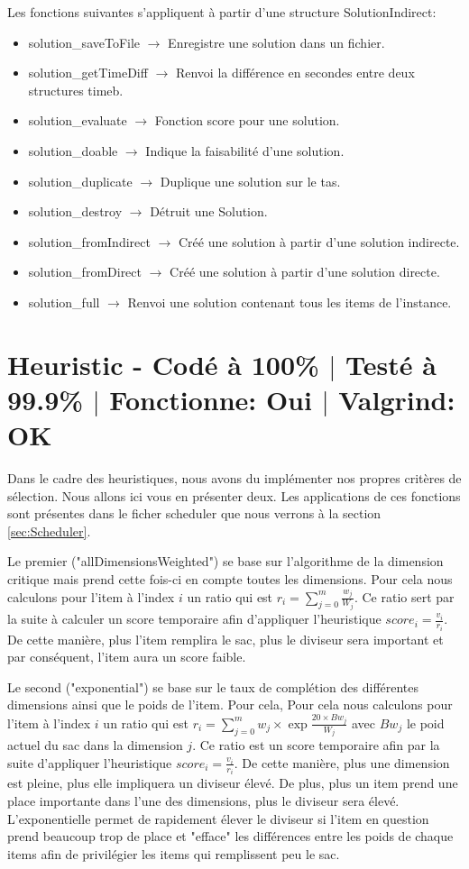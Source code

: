 \documentclass{EPUProjetPeiP}
\newcommand{\comp}[5]{
	\section[#1]{#1 {\small - Codé à #2\% $\vert$ Testé à #3\% $\vert$ Fonctionne: #4 $\vert$ Valgrind: #5}}
}
\begin{document}
Les fonctions suivantes s'appliquent à partir d'une structure SolutionIndirect:
\begin{itemize}
	\item solution\_saveToFile $\longrightarrow$ Enregistre une solution dans un fichier.
	\item solution\_getTimeDiff $\longrightarrow$ Renvoi la différence en secondes entre deux structures timeb.
	\item solution\_evaluate $\longrightarrow$ Fonction score pour une solution.
	\item solution\_doable $\longrightarrow$ Indique la faisabilité d'une solution.
	\item solution\_duplicate $\longrightarrow$ Duplique une solution sur le tas.
	\item solution\_destroy $\longrightarrow$ Détruit une Solution.
	\item solution\_fromIndirect $\longrightarrow$ Créé une solution à partir d'une solution indirecte.
	\item solution\_fromDirect $\longrightarrow$ Créé une solution à partir d'une solution directe.
	\item solution\_full $\longrightarrow$ Renvoi une solution contenant tous les items de l'instance.
\end{itemize}

\comp{Heuristic \label{sec:Heuristic}}{100}{99.9}{Oui}{OK}
Dans le cadre des heuristiques, nous avons du implémenter nos propres critères de sélection. Nous allons ici vous en présenter deux. Les applications de ces fonctions sont présentes dans le ficher scheduler que nous verrons à la section \ref{sec:Scheduler}.

Le premier ("allDimensionsWeighted") se base sur l'algorithme de la dimension critique mais prend cette fois-ci en compte toutes les dimensions. Pour cela nous calculons pour l'item à l'index $i$ un ratio qui est $r_i=\sum_{j=0}^m\frac{w_j}{W_j}$. Ce ratio sert par la suite à calculer un score temporaire afin d'appliquer l'heuristique $score_i=\frac{v_i}{r_i}$. De cette manière, plus l'item remplira le sac, plus le diviseur sera important et par conséquent, l'item aura un score faible.

Le second ("exponential") se base sur le taux de complétion des différentes dimensions ainsi que le poids de l'item. Pour cela, Pour cela nous calculons pour l'item à l'index $i$ un ratio qui est $r_i=\sum_{j=0}^mw_j\times\exp{\frac{20\times Bw_j}{W_j}}$ avec $Bw_j$ le poid actuel du sac dans la dimension $j$. Ce ratio est un score temporaire afin par la suite d'appliquer l'heuristique $score_i=\frac{v_i}{r_i}$. De cette manière, plus une dimension est pleine, plus elle impliquera un diviseur élevé. De plus, plus un item prend une place importante dans l'une des dimensions, plus le diviseur sera élevé. L'exponentielle permet de rapidement élever le diviseur si l'item en question prend beaucoup trop de place et "efface" les différences entre les poids de chaque items afin de privilégier les items qui remplissent peu le sac.
\end{document}
